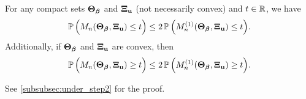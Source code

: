 \begin{lem} \label{lem:ERM_CGMT}
For any compact sets $\bTheta_{\vbeta}$ and $\bXi_{\bu}$ (not necessarily convex) and $t \in \R$, we have
\begin{equation}\label{eq:unbounded_CGMT_1}
    \P \, \Bigl( M_n(\bTheta_{\vbeta}, \bXi_{\bu}) \le t \Bigr) \le 2 \, \P \,\Bigl( M_n^{(1)}(\bTheta_{\vbeta}, \bXi_{\bu}) \le t \Bigr).
\end{equation}
Additionally, if $\bTheta_{\vbeta}$ and $\bXi_{\bu}$ are convex, then
\begin{equation}\label{eq:unbounded_CGMT_2}
    \P \, \Bigl( M_n(\bTheta_{\vbeta}, \bXi_{\bu}) \ge t \Bigr) \le 2 \, \P \,\Bigl( M_n^{(1)}(\bTheta_{\vbeta}, \bXi_{\bu}) \ge t \Bigr).
\end{equation}
\end{lem}
\noindent
See \cref{subsubsec:under_step2} for the proof.




